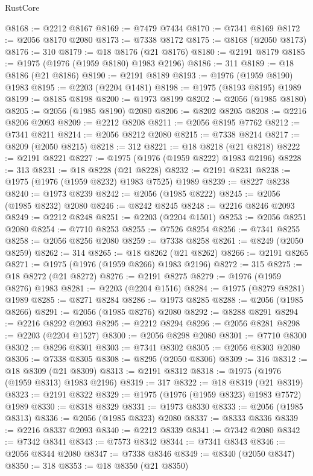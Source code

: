 \begin{lexlean}{RustCore}
\begin{coremodule}
@8168 := @2212 @8167
@8169 := @7479 @7434
@8170 := @7341 @8169
@8172 := @2056 @8170 @2080
@8173 := @7338 @8172
@8175 := @8168 (@2050 @8173)
@8176 := 310
@8179 := @18 @8176 (@21 @8176)
@8180 := @2191 @8179
@8185 := @1975 (@1976 (@1959 @8180) @1983 @2196)
@8186 := 311
@8189 := @18 @8186 (@21 @8186)
@8190 := @2191 @8189
@8193 := @1976 (@1959 @8190) @1983
@8195 := @2203 (@2204 @1481)
@8198 := @1975 (@8193 @8195) @1989
@8199 := @8185 @8198
@8200 := @1973 @8199
@8202 := @2056 (@1985 @8180)
@8205 := @2056 (@1985 @8190) @2080
@8206 := @8202 @8205
@8208 := @2216 @8206 @2093
@8209 := @2212 @8208
@8211 := @2056 @8195 @7762
@8212 := @7341 @8211
@8214 := @2056 @8212 @2080
@8215 := @7338 @8214
@8217 := @8209 (@2050 @8215)
@8218 := 312
@8221 := @18 @8218 (@21 @8218)
@8222 := @2191 @8221
@8227 := @1975 (@1976 (@1959 @8222) @1983 @2196)
@8228 := 313
@8231 := @18 @8228 (@21 @8228)
@8232 := @2191 @8231
@8238 := @1975 (@1976 (@1959 @8232) @1983 @7525) @1989
@8239 := @8227 @8238
@8240 := @1973 @8239
@8242 := @2056 (@1985 @8222)
@8245 := @2056 (@1985 @8232) @2080
@8246 := @8242 @8245
@8248 := @2216 @8246 @2093
@8249 := @2212 @8248
@8251 := @2203 (@2204 @1501)
@8253 := @2056 @8251 @2080
@8254 := @7710 @8253
@8255 := @7526 @8254
@8256 := @7341 @8255
@8258 := @2056 @8256 @2080
@8259 := @7338 @8258
@8261 := @8249 (@2050 @8259)
@8262 := 314
@8265 := @18 @8262 (@21 @8262)
@8266 := @2191 @8265
@8271 := @1975 (@1976 (@1959 @8266) @1983 @2196)
@8272 := 315
@8275 := @18 @8272 (@21 @8272)
@8276 := @2191 @8275
@8279 := @1976 (@1959 @8276) @1983
@8281 := @2203 (@2204 @1516)
@8284 := @1975 (@8279 @8281) @1989
@8285 := @8271 @8284
@8286 := @1973 @8285
@8288 := @2056 (@1985 @8266)
@8291 := @2056 (@1985 @8276) @2080
@8292 := @8288 @8291
@8294 := @2216 @8292 @2093
@8295 := @2212 @8294
@8296 := @2056 @8281
@8298 := @2203 (@2204 @1527)
@8300 := @2056 @8298 @2080
@8301 := @7710 @8300
@8302 := @8296 @8301
@8303 := @7341 @8302
@8305 := @2056 @8303 @2080
@8306 := @7338 @8305
@8308 := @8295 (@2050 @8306)
@8309 := 316
@8312 := @18 @8309 (@21 @8309)
@8313 := @2191 @8312
@8318 := @1975 (@1976 (@1959 @8313) @1983 @2196)
@8319 := 317
@8322 := @18 @8319 (@21 @8319)
@8323 := @2191 @8322
@8329 := @1975 (@1976 (@1959 @8323) @1983 @7572) @1989
@8330 := @8318 @8329
@8331 := @1973 @8330
@8333 := @2056 (@1985 @8313)
@8336 := @2056 (@1985 @8323) @2080
@8337 := @8333 @8336
@8339 := @2216 @8337 @2093
@8340 := @2212 @8339
@8341 := @7342 @2080
@8342 := @7342 @8341
@8343 := @7573 @8342
@8344 := @7341 @8343
@8346 := @2056 @8344 @2080
@8347 := @7338 @8346
@8349 := @8340 (@2050 @8347)
@8350 := 318
@8353 := @18 @8350 (@21 @8350)

\end{coremodule}
\end{lexlean}

